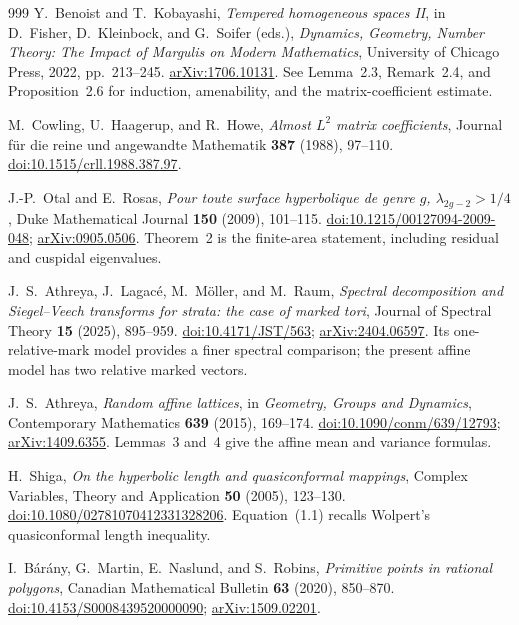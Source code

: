 \documentclass[11pt,a4paper]{article}
\numberwithin{equation}{section}
\theoremstyle{definition}
\theoremstyle{remark}
\begin{document}
\begin{thebibliography}{999}
Y.~Benoist and T.~Kobayashi,
\emph{Tempered homogeneous spaces II},
in D.~Fisher, D.~Kleinbock, and G.~Soifer (eds.),
\emph{Dynamics, Geometry, Number Theory: The Impact of Margulis on Modern Mathematics},
University of Chicago Press, 2022, pp.~213--245.
\href{https://arxiv.org/abs/1706.10131}{arXiv:1706.10131}.
See Lemma~2.3, Remark~2.4, and Proposition~2.6 for induction,
amenability, and the matrix-coefficient estimate.

M.~Cowling, U.~Haagerup, and R.~Howe,
\emph{Almost $L^2$ matrix coefficients},
Journal f\"ur die reine und angewandte Mathematik \textbf{387} (1988), 97--110.
\href{https://doi.org/10.1515/crll.1988.387.97}{doi:10.1515/crll.1988.387.97}.

J.-P.~Otal and E.~Rosas,
\emph{Pour toute surface hyperbolique de genre $g$, $\lambda_{2g-2}>1/4$},
Duke Mathematical Journal \textbf{150} (2009), 101--115.
\href{https://doi.org/10.1215/00127094-2009-048}{doi:10.1215/00127094-2009-048};
\href{https://arxiv.org/abs/0905.0506}{arXiv:0905.0506}.
Theorem~2 is the finite-area statement, including residual and cuspidal
eigenvalues.

J.~S.~Athreya, J.~Lagac\'e, M.~M\"oller, and M.~Raum,
\emph{Spectral decomposition and Siegel--Veech transforms for strata:
the case of marked tori},
Journal of Spectral Theory \textbf{15} (2025), 895--959.
\href{https://doi.org/10.4171/JST/563}{doi:10.4171/JST/563};
\href{https://arxiv.org/abs/2404.06597}{arXiv:2404.06597}.
Its one-relative-mark model provides a finer spectral comparison; the
present affine model has two relative marked vectors.

J.~S.~Athreya,
\emph{Random affine lattices},
in \emph{Geometry, Groups and Dynamics},
Contemporary Mathematics \textbf{639} (2015), 169--174.
\href{https://doi.org/10.1090/conm/639/12793}{doi:10.1090/conm/639/12793};
\href{https://arxiv.org/abs/1409.6355}{arXiv:1409.6355}.
Lemmas~3 and~4 give the affine mean and variance formulas.

H.~Shiga,
\emph{On the hyperbolic length and quasiconformal mappings},
Complex Variables, Theory and Application \textbf{50} (2005), 123--130.
\href{https://doi.org/10.1080/02781070412331328206}{doi:10.1080/02781070412331328206}.
Equation~(1.1) recalls Wolpert's quasiconformal length inequality.


I.~B\'ar\'any, G.~Martin, E.~Naslund, and S.~Robins,
\emph{Primitive points in rational polygons},
Canadian Mathematical Bulletin \textbf{63} (2020), 850--870.
\href{https://doi.org/10.4153/S0008439520000090}{doi:10.4153/S0008439520000090};
\href{https://arxiv.org/abs/1509.02201}{arXiv:1509.02201}.


\end{thebibliography}
\end{document}
